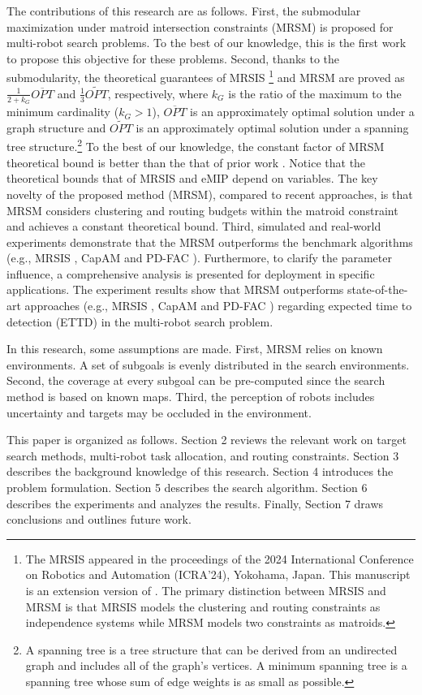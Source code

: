 The contributions of this research are as follows.
First,  the submodular maximization under matroid intersection constraints (MRSM) is proposed for multi-robot search problems.
To the best of our knowledge, this is the first work to propose this objective for these problems.
Second, thanks to the submodularity,
the theoretical guarantees of MRSIS \cite{li2024mrsis}\footnote{
The MRSIS \cite{li2024mrsis} appeared in the proceedings of the 2024 International
Conference on Robotics and Automation (ICRA’24), Yokohama, Japan.
This manuscript is an extension version of \cite{li2024mrsis}.
The primary distinction between MRSIS and MRSM is that MRSIS models the clustering and routing constraints as independence systems while MRSM models two constraints as matroids.} and MRSM are proved as $\frac{1}{2+k_G} \overline{OPT}$ and $\frac{1}{3}\widetilde{OPT}$, respectively, where $k_G$ is the ratio of the maximum to the minimum cardinality ($k_G > 1$), $\overline{OPT}$ is an approximately optimal solution under a graph structure and $\widetilde{OPT}$ is an approximately optimal solution under a spanning tree structure.\footnote{A spanning tree is a tree structure that can be derived from an undirected graph and includes all of the graph's vertices. A minimum spanning tree is a spanning tree whose sum of edge weights is as small as possible.}
To the best of our knowledge, the constant factor of MRSM theoretical bound is better than the that of prior work \cite{li2024mrsis}.
Notice that the theoretical bounds that of MRSIS \cite{li2024mrsis} and eMIP \cite{singh2007efficient} depend on variables.
The key novelty of the proposed method (MRSM), compared to recent approaches, is that MRSM considers clustering and routing budgets within the matroid constraint and achieves a constant theoretical bound.
Third, simulated and real-world experiments demonstrate that the MRSM outperforms the benchmark algorithms (e.g., MRSIS \cite{li2024mrsis}, CapAM \cite{paull2022learning} and PD-FAC \cite{sheng2022pd}). Furthermore, to clarify the parameter influence, a comprehensive analysis is presented for deployment in specific applications.
The experiment results show that MRSM outperforms state-of-the-art approaches (e.g., MRSIS \cite{li2024mrsis}, CapAM \cite{paull2022learning} and PD-FAC \cite{sheng2022pd}) regarding expected time to detection (ETTD) in the multi-robot search problem.

In this research, some assumptions are made. First, MRSM relies on known environments. A set of subgoals is evenly distributed in the search environments.
Second, the coverage at every subgoal can be pre-computed since the search method is based on known maps.
Third, the perception of robots includes uncertainty and targets may be occluded in the environment.

This paper is organized as follows. Section 2 reviews the relevant work on target search methods, multi-robot task allocation, and routing constraints. Section 3 describes the background knowledge of this research. Section 4 introduces the problem formulation. Section 5 describes the search algorithm. Section 6 describes the experiments and analyzes the results. Finally, Section 7 draws conclusions and outlines future work.

